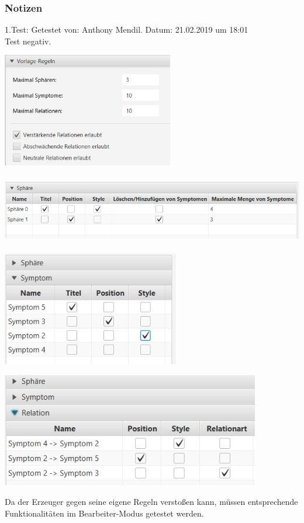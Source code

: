 \documentclass{scrartcl}
\begin{document}
\subsubsection{Notizen}
1.Test: Getestet von: Anthony Mendil. Datum: 21.02.2019 um 18:01 \\
Test negativ. 
\begin{center}
\includegraphics[height=5cm]{template4.PNG}
\end{center}
\begin{center}
\includegraphics[height=3cm]{template1.PNG}
\end{center}
\begin{center}
\includegraphics[height=5cm]{template2.PNG}
\end{center}
\begin{center}
\includegraphics[height=5cm]{template3.PNG}
\end{center}
Da der Erzeuger gegen seine eigene Regeln verstoßen kann, müssen entsprechende Funktionalitäten im Bearbeiter-Modus getestet werden.
\end{document}
